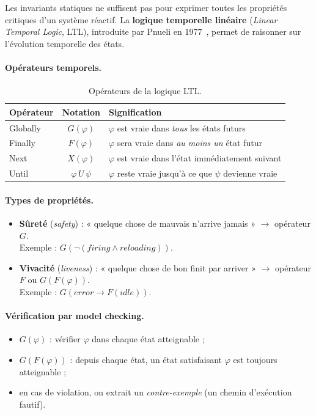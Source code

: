 \documentclass[11pt,a4paper]{article}
\begin{document}
Les invariants statiques ne suffisent pas pour exprimer toutes les propriétés
critiques d'un système réactif. La \textbf{logique temporelle linéaire}
(\emph{Linear Temporal Logic}, LTL), introduite par Pnueli en 1977~\cite{pnueli1977},
permet de raisonner sur l'évolution temporelle des états.

\paragraph{Opérateurs temporels.}
\begin{table}[H]
\centering\small
\begin{tabular}{l c l}
\toprule
\rowcolor{tableheader}\textbf{Opérateur} & \textbf{Notation} & \textbf{Signification} \\
\midrule
Globally
& $G(\varphi)$
& $\varphi$ est vraie dans \emph{tous} les états futurs \\
Finally
& $F(\varphi)$
& $\varphi$ sera vraie dans \emph{au moins un} état futur \\
Next
& $X(\varphi)$
& $\varphi$ est vraie dans l'état immédiatement suivant \\
Until
& $\varphi\, U\, \psi$
& $\varphi$ reste vraie jusqu'à ce que $\psi$ devienne vraie \\
\bottomrule
\end{tabular}
\caption{Opérateurs de la logique LTL.}
\end{table}

\paragraph{Types de propriétés.}
\begin{itemize}[leftmargin=1.2cm,itemsep=2pt]
  \item \textbf{Sûreté} (\emph{safety}) : « quelque chose de mauvais n'arrive
        jamais » $\rightarrow$ opérateur $G$.\\
        Exemple : $G(\neg(\textit{firing} \wedge \textit{reloading}))$.
  \item \textbf{Vivacité} (\emph{liveness}) : « quelque chose de bon finit par
        arriver » $\rightarrow$ opérateur $F$ ou $G(F(\varphi))$.\\
        Exemple : $G(\textit{error} \rightarrow F(\textit{idle}))$.
\end{itemize}

\paragraph{Vérification par model checking.}
\begin{itemize}[leftmargin=1.2cm,itemsep=2pt]
  \item $G(\varphi)$ : vérifier $\varphi$ dans chaque état atteignable ;
  \item $G(F(\varphi))$ : depuis chaque état, un état satisfaisant $\varphi$
        est toujours atteignable ;
  \item en cas de violation, on extrait un \emph{contre-exemple} (un chemin
        d'exécution fautif).
\end{itemize}
\end{document}
